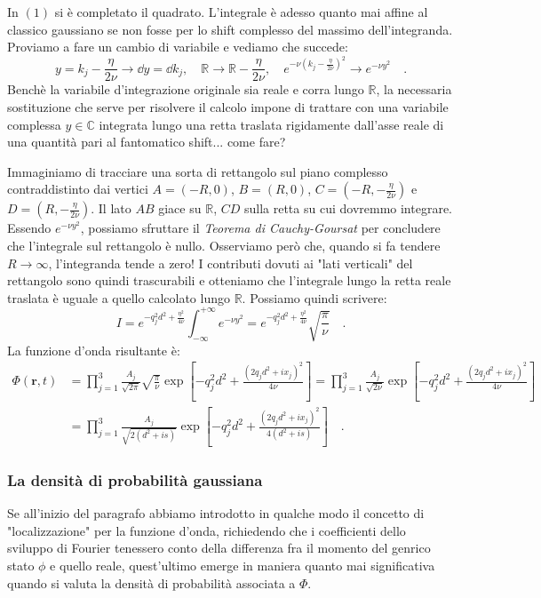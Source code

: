 In $(1)$ si è completato il quadrato. L'integrale è adesso quanto mai affine al classico gaussiano se non fosse per lo shift complesso del massimo dell'integranda. Proviamo a fare un cambio di variabile e vediamo che succede:
\[
    y = k_j - \frac{\eta}{2\nu} \rightarrow \dd{y} = \dd{k_j}, \quad \mathbb{R} \to \mathbb{R} - \frac{\eta}{2\nu}, \quad e^{-\nu\left( k_j - \frac{\eta}{2\nu} \right)^2} \to e^{-\nu y^2} \quad.
\]
Benchè la variabile d'integrazione originale sia reale e corra lungo $\mathbb{R}$, la necessaria sostituzione che serve per risolvere il calcolo impone di trattare con una variabile complessa $y \in \mathbb{C}$ integrata lungo una retta traslata rigidamente dall'asse reale di una quantità pari al fantomatico shift... come fare? 

Immaginiamo di tracciare una sorta di rettangolo sul piano complesso contraddistinto dai vertici $A = \left( -R, 0 \right)$, $B = \left( R, 0 \right)$, $C = \left( -R, -\frac{\eta}{2\nu}\right)$ e $D = \left( R, -\frac{\eta}{2\nu}\right)$. Il lato $AB$ giace su $\mathbb{R}$, $CD$ sulla retta su cui dovremmo integrare. Essendo $e^{-\nu y^2}$, possiamo sfruttare il \emph{Teorema di Cauchy-Goursat} per concludere che l'integrale sul rettangolo è nullo. Osserviamo però che, quando si fa tendere $R \to \infty$, l'integranda tende a zero! I contributi dovuti ai "lati verticali" del rettangolo sono quindi trascurabili e otteniamo che l'integrale lungo la retta reale traslata è uguale a quello calcolato lungo $\mathbb{R}$. Possiamo quindi scrivere:
\[
I = e^{-q_j^2 d^2 + \frac{\eta^2}{4\nu}} \int_{-\infty}^{+\infty}e^{-\nu y^2} = e^{-q_j^2 d^2 + \frac{\eta^2}{4\nu}} \sqrt{\frac{\pi}{\nu}} \quad.
\]
La funzione d'onda risultante è:
\[
\begin{aligned}
    \Phi(\bm{r},t) &= \prod_{j=1}^{3} \frac{A_j}{\sqrt{2\pi}} \sqrt{\frac{\pi}{\nu}} \exp[-q_j^2d^2 + \frac{(2q_jd^2 + ix_j)^2}{4\nu}]  = \prod_{j=1}^{3} \frac{A_j}{\sqrt{2\nu}} \exp[-q_j^2d^2 + \frac{(2q_jd^2 + ix_j)^2}{4\nu}] \\
    &= \prod_{j=1}^{3} \frac{A_j}{\sqrt{2(d^2 + is)}} \exp[-q_j^2d^2 + \frac{(2q_jd^2 + ix_j)^2}{4(d^2+is)}] \quad.
\end{aligned}
\]  

\subsubsection{La densità di probabilità gaussiana}
Se all'inizio del paragrafo abbiamo introdotto in qualche modo il concetto di "localizzazione" per la funzione d'onda, richiedendo che i coefficienti dello sviluppo di Fourier tenessero conto della differenza fra il momento del genrico stato $\phi$ e quello reale, quest'ultimo emerge in maniera quanto mai significativa quando si valuta la densità di probabilità associata a $\Phi$. 


